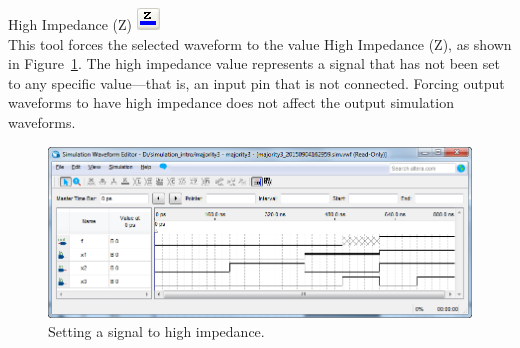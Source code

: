 \documentclass[11pt, twoside, pdftex]{article}
\begin{document}
\begin{description}
	\item {\sf High Impedance (Z)} \hbox{\includegraphics[scale=0.7]{figures/appendix/icon6.png}}\\
	This tool forces the selected waveform to the value {\sf High Impedance (Z)}, as shown in Figure~\ref{fig:fig6}. 
	The high impedance value represents a signal that has not been set to any specific value---that is, an input pin 
	that is not connected. Forcing output waveforms to have high impedance does not affect the 
	output simulation waveforms.
	\begin{figure}[H]
	   \begin{center}
	      \includegraphics[scale=0.65]{figures/appendix/figure6.png}
	   \caption{Setting a signal to high impedance.} 
		 \label{fig:fig6}
		 \end{center}
	\end{figure}
	

\end{description}
\end{document}
